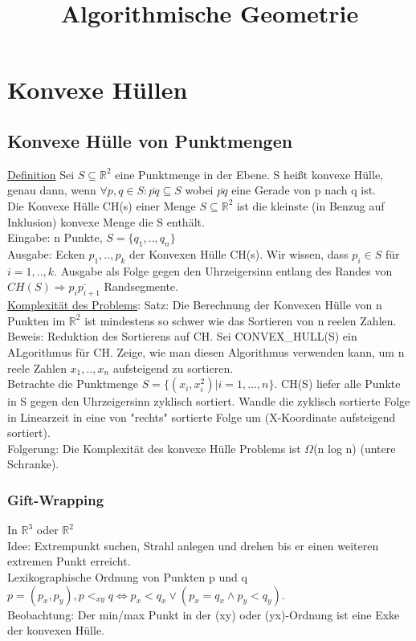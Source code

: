 \documentclass[a4paper]{article}
\begin{document}
\title{Algorithmische Geometrie}
\maketitle
\section{Konvexe Hüllen}
\subsection{Konvexe Hülle von Punktmengen}
\underline{Definition} Sei $S\subseteq \mathbb{R}^2$ eine Punktmenge in der Ebene. S heißt konvexe Hülle, genau dann, wenn $\forall p,q\in S: \overline{pq} \subseteq S$ wobei $\overline{pq}$ eine Gerade von p nach q ist.\\
Die Konvexe Hülle CH(s) einer Menge $S\subseteq \mathbb{R}^2$ ist die kleinste (in Benzug auf Inklusion) konvexe Menge die S enthält.\\

Eingabe: n Punkte, $S=\{q_1,..,q_n\}$\\
Ausgabe: Ecken $p_1,..,p_k$ der Konvexen Hülle CH(s). Wir wissen, dass $p_i \in S$ für $i=1,..,k$. Ausgabe als Folge gegen den Uhrzeigersinn entlang des Randes von $CH(S)\Rightarrow \overline{p_ip_{i+1}}$ Randsegmente.\\
\underline{Komplexität des Problems}: Satz: Die Berechnung der Konvexen Hülle von n Punkten im $\mathbb{R}^2$ ist mindestens so schwer wie das Sortieren von n reelen Zahlen.\\
Beweis: Reduktion des Sortierens auf CH. Sei CONVEX\_HULL(S) ein ALgorithmus für CH. Zeige, wie man diesen Algorithmus verwenden kann, um n reele Zahlen $x_1,..,x_n$ aufsteigend zu sortieren.\\
Betrachte die Punktmenge $S=\{(x_i,x_i^2)|i=1,...,n\}$. CH(S) liefer alle Punkte in S gegen den Uhrzeigersinn zyklisch sortiert. Wandle die zyklisch sortierte Folge in Linearzeit in eine von "rechts" sortierte Folge um (X-Koordinate aufsteigend sortiert).\\
Folgerung: Die Komplexität des konvexe Hülle Problems ist $\Omega$(n log n) (untere Schranke).
\subsubsection{Gift-Wrapping}
In $\mathbb{R}^3$ oder $\mathbb{R}^2$\\
Idee: Extrempunkt suchen, Strahl anlegen und drehen bis er einen weiteren extremen Punkt erreicht.\\
Lexikographische Ordnung von Punkten p und q $p=(p_x,p_y), p<_{xy} q \Leftrightarrow p_x < q_x \vee (p_x=q_x \wedge p_y<q_y)$.\\
Beobachtung: Der min/max  Punkt in der (xy) oder (yx)-Ordnung ist eine Exke der konvexen Hülle.
\end{document}
